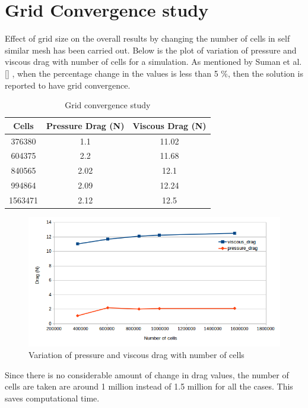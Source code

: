 \section{Grid Convergence study}

Effect of grid size on the overall results by  changing the number of cells in self similar mesh has been carried out. Below is the plot of variation of pressure and viscous drag with number of cells for a simulation. As mentioned by Suman et al.[] , when the percentage change in the values is less than 5 \%, then the solution is reported to have grid convergence.

\begin{table}[H]
	\caption{Grid convergence study}
	\label{Grid convergence table}
	\centering
	\begin{tabular}{ccc}
		\hline \hline
		Cells & Pressure Drag (N) & Viscous Drag (N) \\
		\hline \hline
		376380 & 1.1  & 11.02 \\
		604375  & 2.2  & 11.68 \\
		840565  & 2.02  & 12.1 \\
		994864  & 2.09  & 12.24 \\
		1563471  & 2.12 & 12.5 \\
		\hline \hline
	\end{tabular}
\end{table}

\begin{figure}[H]
	\centering
	\includegraphics[width=300 pt]{surrogate_model_CFD_results/Grid_convergence.png}
	\caption{Variation of pressure and viscous drag with number of cells}
	\label{Grid convergence plot} %
\end{figure}
Since there is no considerable amount of change in drag values, the number of cells are taken are around 1 million instead of 1.5 million for all the cases. This saves computational time.

